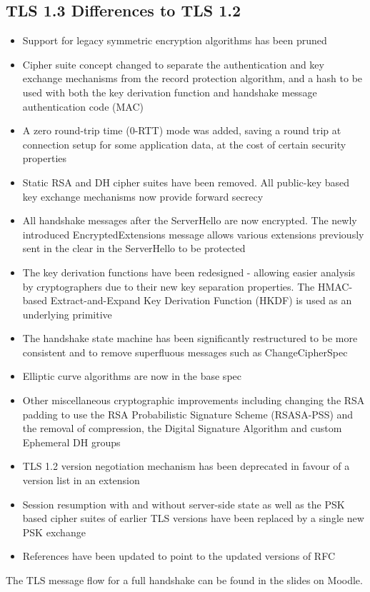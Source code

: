 \subsection{TLS 1.3 Differences to TLS 1.2}
\begin{itemize}
    \item Support for legacy symmetric encryption algorithms has been pruned 
    \item Cipher suite concept changed to separate the authentication and key exchange mechanisms from the record protection algorithm, and a hash to be used with both the key derivation function and handshake message authentication code (MAC)
    \item A zero round-trip time (0-RTT) mode was added, saving a round trip at connection setup for some application data, at the cost of certain security properties
    \item Static RSA and DH cipher suites have been removed. All public-key based key exchange mechanisms now provide forward secrecy
    \item All handshake messages after the ServerHello are now encrypted. The newly introduced EncryptedExtensions message allows various extensions previously sent in the clear in the ServerHello to be protected 
    \item The key derivation functions have been redesigned - allowing easier analysis by cryptographers due to their new key separation properties. The HMAC-based Extract-and-Expand Key Derivation Function (HKDF) is used as an underlying primitive
    \item The handshake state machine has been significantly restructured to be more consistent and to remove superfluous messages such as ChangeCipherSpec
    \item Elliptic curve algorithms are now in the base spec
    \item Other miscellaneous cryptographic improvements including changing the RSA padding to use the RSA Probabilistic Signature Scheme (RSASA-PSS) and the removal of compression, the Digital Signature Algorithm and custom Ephemeral DH groups
    \item TLS 1.2 version negotiation mechanism has been deprecated in favour of a version list in an extension
    \item Session resumption with and without server-side state as well as the PSK based cipher suites of earlier TLS versions have been replaced by a single new PSK exchange
    \item References have been updated to point to the updated versions of RFC
\end{itemize}

\begin{extlink}
The TLS message flow for a full handshake can be found in the slides on Moodle.
\end{extlink}